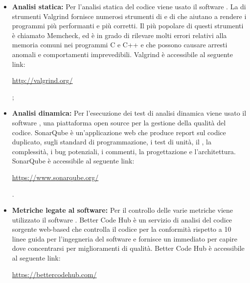 \documentclass[../NormediProgetto.tex]{subfiles}
\begin{document}
	\begin{itemize}
		\item \textbf{Analisi statica:} Per l’analisi statica del codice viene usato il software . La  di strumenti Valgrind fornisce numerosi strumenti di  e di  che aiutano a rendere i programmi più performanti e più corretti. Il più popolare di questi strumenti è chiamato Memcheck, ed è in grado di rilevare molti errori relativi alla memoria comuni nei programmi C e C++ e che possono causare arresti anomali e comportamenti imprevedibili. Valgrind è accessibile al seguente link: \\ \centerline{\url{http://valgrind.org/}};
		
		\item \textbf{Analisi dinamica:} Per l’esecuzione dei test di analisi dinamica viene usato il software , una piattaforma open source per la gestione della qualità del codice. SonarQube è un’applicazione web che produce report sul codice duplicato, sugli standard di programmazione, i test di unità, il , la complessità, i bug potenziali, i commenti, la progettazione e l’architettura. SonarQube è accessibile al seguente link: \\ \centerline{\url{https://www.sonarqube.org/}}.
		
		\item \textbf{Metriche legate al software:} Per il controllo delle varie metriche viene utilizzato il software . Better Code Hub è un servizio di analisi del codice sorgente web-based che controlla il codice per la conformità rispetto a 10 linee guida per l'ingegneria del software e fornisce un  immediato per capire dove concentrarsi per miglioramenti di qualità. Better Code Hub è accessibile al seguente link:\\ \centerline{\url{https://bettercodehub.com/}}
	\end{itemize}
\end{document}
